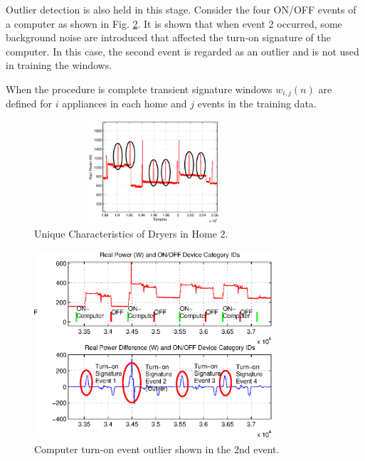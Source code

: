 \documentclass[conference]{IEEEtran}
\begin{document}
Outlier detection is also held in this stage.  Consider the four ON/OFF events of a computer as shown in Fig. \ref{fig:outlier}.  It is shown that when event 2 occurred, some background noise are introduced that affected the turn-on signature of the computer.  In this case, the second event is regarded as an outlier and is not used in training the windows.

When the procedure is complete transient signature windows $w_{i,j}(n)$ are defined for $i$ appliances in each home and $j$ events in the training data.

\begin{figure}[!t]
	\centering
	\includegraphics[width=3.5in, height=1.5in]{fig/dryerH2.eps}
	\caption{Unique Characteristics of Dryers in Home 2.}
	\label{fig:dryerH2}
\end{figure}
	
\begin{figure}[!t]
	\centering
	\includegraphics[width=3.5in]{fig/outlier.eps}
	\caption{Computer turn-on event outlier shown in the 2nd event.}
	\label{fig:outlier}
\end{figure}


\end{document}

